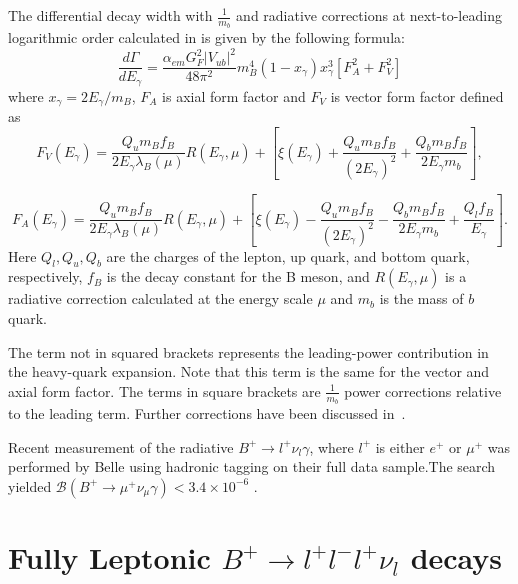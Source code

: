 The differential decay width with $\frac{1}{m_{b}}$ and radiative corrections
at next-to-leading logarithmic order calculated in\cite{Beneke:2011nf} is given by the following formula:
\begin{equation}
\frac{d\Gamma}{dE_{\gamma}} = \frac{\alpha_{em}G^{2}_{F}|V_{ub}|^{2}}{48 \pi^{2}}m_{B}^{4}(1 - x_{\gamma})x_{\gamma}^{3}[F_A^{2} + F_V^{2}]
\end{equation}
 where $x_{\gamma} = 2E_{\gamma}/m_{B}$, $F_A$ is axial form factor and $F_V$  is vector form factor defined as
\begin{equation}
F_{V}(E_{\gamma}) = \frac{Q_{u}m_{B}f_{B}}{2E_{\gamma}\lambda_{B}(\mu)} R(E_{\gamma}, \mu) + [\xi(E_\gamma) +  \frac{Q_{u}m_{B}f_{B}}{(2E_{\gamma})^{2}} + \frac{Q_{b}m_{B}f_{B}}{2E_{\gamma}m_{b}}],
\end{equation}

\begin{equation}
F_{A}(E_{\gamma}) = \frac{Q_{u}m_{B}f_{B}}{2E_{\gamma}\lambda_{B}(\mu)} R(E_{\gamma}, \mu) + [\xi(E_\gamma) -  \frac{Q_{u}m_{B}f_{B}}{(2E_{\gamma})^{2}} - \frac{Q_{b}m_{B}f_{B}}{2E_{\gamma}m_{b}} + \frac{Q_{l}f_{B}}{E_{\gamma}}].
\end{equation}
Here $Q_{l},Q_{u},Q_{b}$ are the charges of the lepton, up quark, and
bottom quark, respectively, $f_{B}$ is the decay constant for
the B meson, and $R(E_{\gamma}, \mu)$ is a radiative correction
calculated at the energy scale $\mu$ %
and $m_{b}$ is the mass of $b$ quark.

The term not in squared brackets represents the leading-power contribution in the heavy-quark expansion. Note that this term
is the same for the vector and axial form factor. The terms in square brackets are $\frac{1}{m_{b}}$ power corrections relative to the leading term. Further corrections have been discussed in~\cite{Wang:2016beq}.



Recent measurement of the radiative $B^{+} \rightarrow l^{+} \nu_{l} \gamma$, where $l^{+}$ is either $e^{+}$ or $\mu^{+}$ was performed by Belle using hadronic tagging on their full data sample\cite{Heller:2015vvm}.The search yielded $\mathcal{B}(B^{+}\rightarrow \mu^{+} \nu_\mu \gamma) < 3.4\times 10^{-6}$ \cite{Heller:2015vvm}.



\section{Fully Leptonic $B^{+}\rightarrow l^{+} l^{-} l^{+} \nu_{l} $ decays}

